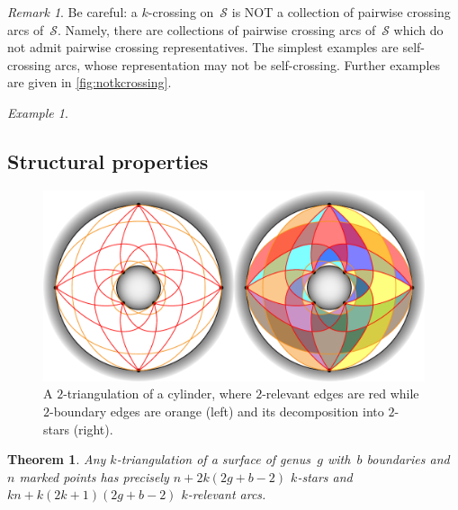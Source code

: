 \documentclass{amsart}
\newtheorem{theorem}{Theorem}[section]
\theoremstyle{remark}
\newtheorem{remark}{Remark}[section]
\newtheorem{example}{Example}
\newcommand*{\ktg}[0]{$k$-triangulation\xspace}
\newcommand{\surface}{\mathcal{S}}
\newcommand{\vincent}[1]{\todo[color=blue!30]{#1 \\ \hfill --- V.}}
\begin{document}
\begin{remark}
Be careful: a $k$-crossing on~$\surface$ is NOT a collection of pairwise crossing arcs of~$\surface$. Namely, there are collections of pairwise crossing arcs of~$\surface$ which do not admit pairwise crossing representatives. The simplest examples are self-crossing arcs, whose representation may not be self-crossing. Further examples are given in \cref{fig:notkcrossing}.
\vincent{Todo.}
\end{remark}

\begin{example}

\end{example}



\subsection{Structural properties}

\begin{figure}[t]
	\capstart
	\centerline{\includegraphics[scale=.5]{2triangCylinderStars}}
	\caption{A $2$-triangulation of a cylinder, where $2$-relevant edges are red while $2$-boundary edges are orange (left) and its decomposition into $2$-stars (right).}
	\label{fig:starsSurface}
\end{figure}

\begin{theorem}
\label{thm:structureSurface}
Any \ktg of a surface of genus~$g$ with~$b$ boundaries and~$n$ marked points has precisely $n + 2k(2g + b - 2)$ $k$-stars and $kn + k(2k + 1)(2g + b - 2)$ $k$-relevant arcs.
\end{theorem}
\end{document}
